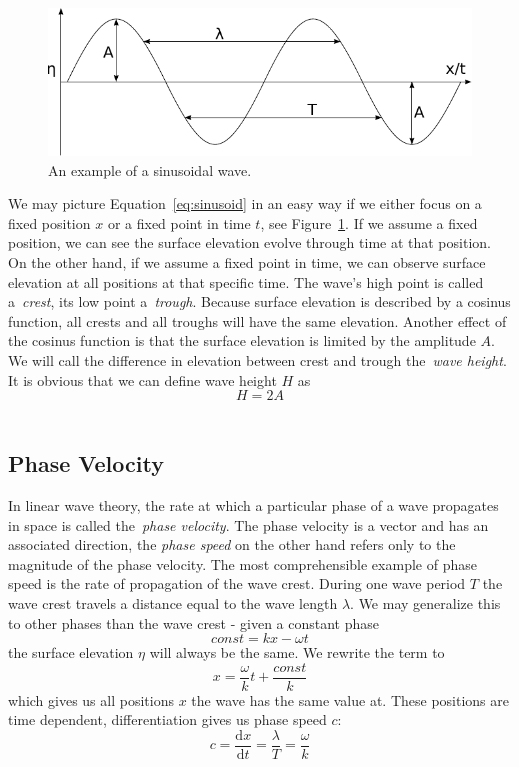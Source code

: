 \begin{figure}[b]
	\centering
	\includegraphics[width=\textwidth]{figures/sinusoid}
	\caption{An example of a sinusoidal wave.}
	\label{fig:sinusoid}
\end{figure}
%
We may picture Equation~\ref{eq:sinusoid} in an easy way if we either focus on a fixed position $x$
or a fixed point in time $t$, see Figure~\ref{fig:sinusoid}. If we assume a fixed position, we can
see the surface elevation evolve through time at that position. On the other hand, if we assume a fixed
point in time, we can observe surface elevation at all positions at that specific time.
The wave's high point is called a~\emph{crest}, its low point a~\emph{trough}. Because surface elevation
is described by a cosinus function, all crests and all troughs will have the
same elevation. Another effect of the cosinus function is that the surface
elevation is limited by the amplitude $A$. We will call the difference in
elevation between crest and trough the~\emph{wave height}. It is obvious that we
can define wave height $H$ as
\begin{equation}
 H = 2A
\end{equation}
\\

\subsection{Phase Velocity}
\label{sec:phase_velocity}
In linear wave theory, the rate at which a particular phase of a wave propagates in space is called
the~\emph{phase velocity}. The phase velocity is a vector and has an associated direction,
the \emph{phase speed} on the other hand refers only to the magnitude of the phase velocity.
The most comprehensible example of phase speed is the rate of propagation of the wave crest.
During one wave period $T$ the wave crest travels a distance equal to the wave length $\lambda$.
We may generalize this to other phases than the wave crest - given a constant phase
\begin{equation}
  const = kx - \omega t
\end{equation}
the surface elevation $\eta$ will always be the same. We rewrite the term to
\begin{equation}
  x = \frac{\omega}{k}t + \frac{const}{k}
\end{equation}
which gives us all positions $x$ the wave has the same value at. These positions are time dependent,
differentiation gives us phase speed $c$:
\begin{equation}
  c = \frac{\mathrm dx}{\mathrm dt} = \frac{\lambda}{T} = \frac{\omega}{k}
\end{equation}

